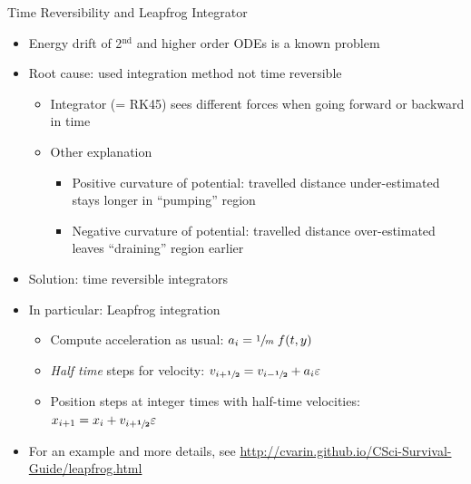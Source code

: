 \begin{frame}{Time Reversibility and Leapfrog Integrator}
%
\begin{itemize}
\item Energy drift of 2$^{\text{nd}}$ and higher order ODEs is a known problem
\item Root cause: used integration method not time reversible
	\begin{itemize}
	\item Integrator (= RK45) sees different forces when going forward or backward in time
	\item Other explanation
		\begin{itemize}
		\item Positive curvature of potential: travelled distance under-estimated 
			\Thus stays longer in \enquote{pumping} region
		\item Negative curvature of potential: travelled distance over-estimated
			\Thus leaves \enquote{draining} region earlier
		\end{itemize}
	\end{itemize}
\item Solution: time reversible integrators
\item In particular: Leapfrog integration
	\begin{itemize}
	\item Compute acceleration as usual: $a_i = \sfrac{1}{m} \; f(t, y)$
	\item \emph{Half time} steps for velocity: $v_{i + \mathbf{\sfrac{1}{2}}} =
		v_{i - \mathbf{\sfrac{1}{2}}} +
		a_i \varepsilon$
	\item Position steps at integer times with half-time velocities: $x_{i+1} = x_i + v_{i + \mathbf{\sfrac{1}{2}}} \varepsilon$
	\end{itemize}
\item For an example and more details, see \url{http://cvarin.github.io/CSci-Survival-Guide/leapfrog.html} 
\end{itemize}
%
\end{frame}


